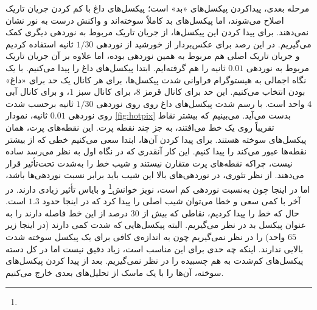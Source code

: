 \documentclass[12pt,a4paper]{article}
\begin{document}
	مرحله بعدی، پیداکردن پیکسل‌های «بد» است؛ پیکسل‌های داغ با کم کردن جریان تاریک اصلاح می‌شوند، اما پیکسل‌های بد کاملاً
	سوخته‌اند و واکنش درست به نور نشان نمی‌دهند. برای پیدا کردن این پیکسل‌ها، از جریان تاریک مربوط به نوردهی دیگری
	کمک می‌گیریم. در این رصد برای عکس‌بردار از خورشید از نوردهی $1/30$ ثانیه استفاده کردیم و جریان تاریک اصلی هم
	مربوط به همین نوردهی بوده، اما علاوه بر آن جریان تاریک مربوط به نوردهی $0.01$ ثانیه را هم گرفته‌ایم. ابتدا پیکسل‌های
	داغ را پیدا می‌کنیم. با یک نگاه اجمالی به هیستوگرام فراوانی شدت پیکسل‌ها، برای هر کانال یک حد برای «داغ» بودن انتخاب
	می‌کنیم. این حد برای کانال قرمز $8$، برای کانال سبز $1$، و برای کانال آبی $4$ واحد است. با رسم شدت پیکسل‌های داغ روی
	روی نوردهی $1/30$ ثانیه برحسب شدت روی نوردهی $0.01$ ثانیه، نمودار \ref{fig:hotpix} بدست می‌آید. می‌بینیم که بیشتر
	نقاط تقریباً روی یک خط می‌افتند، به جز چند نقطه پرت. این نقطه‌های پرت، همان پیکسل‌های سوخته هستند. برای پیدا کردن
	آن‌ها، ابتدا سعی می‌کنیم خطی که از بیشتر نقطه‌ها عبور می‌کند را پیدا کنیم. این کار آنقدری که در نگاه اول به نظر
	می‌رسد ساده نیست، چراکه نقطه‌های پرت متقارن نیستند و شیب خط را به‌شدت تحت‌تأثیر قرار می‌دهند. از نظر تئوری،
	در نوردهی‌های بالا این شیب باید برابر نسبت نوردهی‌ها باشد، اما در اینجا چون به‌نسبت نوردهی کم است، نویز
	خوانش\footnote{} و بایاس تأثیر زیادی دارند. در آخر با کمی سعی و خطا می‌توان شیب اصلی را پیدا کرد
	که در اینجا حدود $1.3$ است. حال که خط را پیدا کردیم، نقاطی که بیش از $30$ درصد از این خط فاصله دارند را به عنوان
	پیکسل بد در نظر می‌گیریم. البته پیکسل‌هایی که شدت کمی دارند (در اینجا زیر $65$ واحد) را در نظر نمی‌گیریم چون
	به اندازه‌ی کافی برای یک پیکسل سوخته شدت بالایی ندارند. اینکه چه حدی برای این  مناسب است، زیاد دقیق
	نیست اما در کل دسته پیکسل‌های کم‌شدت به هم چسبیده را در نظر نمی‌گیریم. بعد از پیدا کردن پیکسل‌های سوخته، آن‌ها را با
	یک ماسک از تحلیل‌های بعدی خارج می‌کنیم.
	
\end{document}
